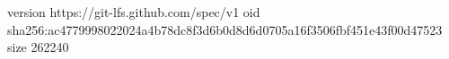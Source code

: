version https://git-lfs.github.com/spec/v1
oid sha256:ac4779998022024a4b78dc8f3d6b0d8d6d0705a16f3506fbf451e43f00d47523
size 262240
